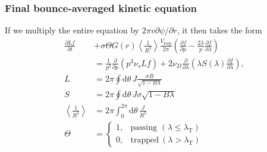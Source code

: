 \documentclass[11pt,a4paper]{article}
\newcommand{\rd}{\ensuremath{\mathrm{d}}}
\newcommand{\sub}[1]{\ensuremath{_{\text{#1}}}}
\begin{document}
\subsubsection*{Final bounce-averaged kinetic equation}
If we multiply the entire equation by $2\pi v \partial \psi/\partial r$, it then takes the form
\begin{align}
\frac{\partial Lf}{\partial t} &+ \sigma\Theta G(r) \left\langle\frac{1}{R^2}\right\rangle\frac{V\sub{loop}}{2\pi}\left(\frac{\partial  f}{\partial p} - \frac{2\lambda}{p}\frac{\partial f}{\partial \lambda} \right) \nonumber \\
&= \frac{1}{p^2}\frac{\partial}{\partial p}( p^3 \nu_s L f) +  2\nu_D \frac{\partial}{\partial \lambda} \left(\lambda S(\lambda)\frac{\partial f}{\partial \lambda}\right), \\
L &=2\pi \oint \rd\theta \, J\frac{\sigma B}{\sqrt{1-B\lambda}} \nonumber \\
S &= 2\pi \oint \rd \theta \,J\sigma\sqrt{1-B\lambda} \nonumber \\
\left\langle\frac{1}{R^2}\right\rangle &= 2\pi \int_0^{2\pi} \rd\theta \, \frac{J}{R^2} \nonumber \\
\Theta &= \begin{cases}
1, & \text{passing} ~ \, (\lambda \leq \lambda\sub{T}) \\
0, & \text{trapped} ~ (\lambda > \lambda\sub{T})
\end{cases}
\end{align}
\end{document}
